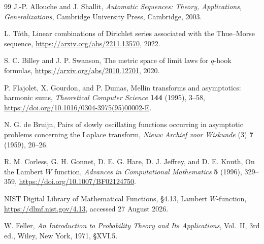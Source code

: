 \documentclass[11pt,a4paper]{article}
\theoremstyle{frontier}
\theoremstyle{definition}
\begin{document}
\begin{thebibliography}{99}
J.-P. Allouche and J. Shallit,
\emph{Automatic Sequences: Theory, Applications, Generalizations},
Cambridge University Press, Cambridge, 2003.

L. T\'oth,
Linear combinations of Dirichlet series associated with the Thue--Morse sequence,
\url{https://arxiv.org/abs/2211.13570}, 2022.

S. C. Billey and J. P. Swanson,
The metric space of limit laws for $q$-hook formulas,
\url{https://arxiv.org/abs/2010.12701}, 2020.

P. Flajolet, X. Gourdon, and P. Dumas,
Mellin transforms and asymptotics: harmonic sums,
\emph{Theoretical Computer Science} \textbf{144} (1995), 3--58,
\url{https://doi.org/10.1016/0304-3975(95)00002-E}.

N. G. de Bruijn,
Pairs of slowly oscillating functions occurring in asymptotic problems concerning the Laplace transform,
\emph{Nieuw Archief voor Wiskunde} (3) \textbf{7} (1959), 20--26.

R. M. Corless, G. H. Gonnet, D. E. G. Hare, D. J. Jeffrey, and D. E. Knuth,
On the Lambert $W$ function,
\emph{Advances in Computational Mathematics} \textbf{5} (1996), 329--359,
\url{https://doi.org/10.1007/BF02124750}.

NIST Digital Library of Mathematical Functions,
\S4.13, Lambert $W$-function,
\url{https://dlmf.nist.gov/4.13}, accessed 27 August 2026.

W. Feller,
\emph{An Introduction to Probability Theory and Its Applications}, Vol.~II, 3rd ed.,
Wiley, New York, 1971, \S XVI.5.

\end{thebibliography}
\end{document}
